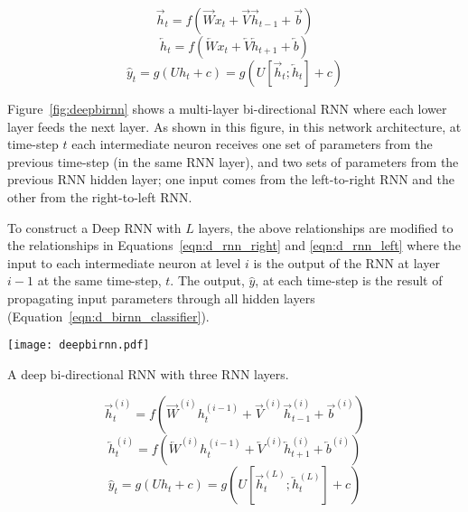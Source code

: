 \documentclass{tufte-handout}
\begin{document}
\begin{equation}
	\overrightarrow{h}_t = f(\overrightarrow{W} x_t + \overrightarrow{V} \overrightarrow{h}_{t-1} + \overrightarrow{b})
	\label{eqn:rnn_right}
\end{equation}
\begin{equation}
	\overleftarrow{h}_t = f(\overleftarrow{W} x_t + \overleftarrow{V} \overleftarrow{h}_{t+1} + \overleftarrow{b})
	\label{eqn:rnn_left}
\end{equation}
\begin{equation}
	\hat{y}_t = g(U h_t + c) = g(U [\overrightarrow{h}_t; \overleftarrow{h}_t] + c)
	\label{eqn:birnn_classifier}
\end{equation}

Figure~\ref{fig:deepbirnn} shows a multi-layer bi-directional RNN where each lower layer feeds the next layer. As shown in this figure, in this network architecture, at time-step $t$ each intermediate neuron receives one set of parameters from the previous time-step (in the same RNN layer), and two sets of parameters from the previous RNN hidden layer; one input comes from the left-to-right RNN and the other from the right-to-left RNN.

To construct a Deep RNN with $L$ layers, the above relationships are modified to the relationships in Equations~\ref{eqn:d_rnn_right} and \ref{eqn:d_rnn_left} where the input to each intermediate neuron at level $i$ is the output of the RNN at layer $i-1$ at the same time-step, $t$. The output, $\hat{y}$, at each time-step is the result of propagating input parameters through all hidden layers (Equation~\ref{eqn:d_birnn_classifier}).

\begin{marginfigure}
	\centering
	\texttt{[image: deepbirnn.pdf]}
	\caption {A deep bi-directional RNN with three RNN layers.}
	\label{fig:deepbirnn}
\end{marginfigure}

\begin{equation}
	\overrightarrow{h}_t^{(i)} = f(\overrightarrow{W}^{(i)} h_t^{(i-1)} + \overrightarrow{V}^{(i)} \overrightarrow{h}_{t-1}^{(i)} + \overrightarrow{b}^{(i)})
	\label{eqn:d_rnn_right}
\end{equation}
\begin{equation}
	\overleftarrow{h}_t^{(i)} = f(\overleftarrow{W}^{(i)} h_t^{(i-1)} + \overleftarrow{V}^{(i)} \overleftarrow{h}_{t+1}^{(i)} + \overleftarrow{b}^{(i)})
	\label{eqn:d_rnn_left}
\end{equation}
\begin{equation}
	\hat{y}_t = g(U h_t + c) = g(U [\overrightarrow{h}_t^{(L)}; \overleftarrow{h}_t^{(L)}] + c)
	\label{eqn:d_birnn_classifier}
\end{equation}
\end{document}
